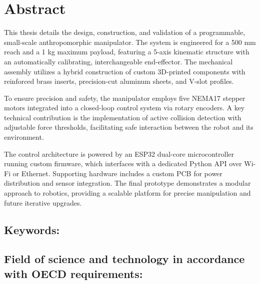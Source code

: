 \chapter*{Abstract} %
This thesis details the design, construction, and validation of a programmable, small-scale anthropomorphic manipulator. The system is engineered for a 500 mm reach and a 1 kg maximum payload, featuring a 5-axis kinematic structure with an automatically calibrating, interchangeable end-effector. The mechanical assembly utilizes a hybrid construction of custom 3D-printed components with reinforced brass inserts, precision-cut aluminum sheets, and V-slot profiles.

To ensure precision and safety, the manipulator employs five NEMA17 stepper motors integrated into a closed-loop control system via rotary encoders. A key technical contribution is the implementation of active collision detection with adjustable force thresholds, facilitating safe interaction between the robot and its environment.

The control architecture is powered by an ESP32 dual-core microcontroller running custom firmware, which interfaces with a dedicated Python API over Wi-Fi or Ethernet. Supporting hardware includes a custom PCB for power distribution and sensor integration. The final prototype demonstrates a modular approach to robotics, providing a scalable platform for precise manipulation and future iterative upgrades.

\section*{Keywords:}
\section*{Field of science and technology in accordance with OECD requirements:}
